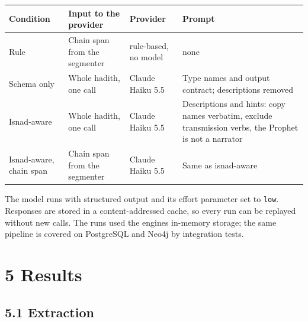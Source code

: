 \documentclass[
  english,
]{article}
\newcounter{none} %
\begin{document}
{\def\LTcaptype{none} %
\begin{longtable}[]{@{}
  >{\raggedright\arraybackslash}p{}
  >{\raggedright\arraybackslash}p{}
  >{\raggedright\arraybackslash}p{}
  >{\raggedright\arraybackslash}p{}@{}}
\toprule\noalign{}
\begin{minipage}[b]{\linewidth}\raggedright
Condition
\end{minipage} & \begin{minipage}[b]{\linewidth}\raggedright
Input to the provider
\end{minipage} & \begin{minipage}[b]{\linewidth}\raggedright
Provider
\end{minipage} & \begin{minipage}[b]{\linewidth}\raggedright
Prompt
\end{minipage} \\
\midrule\noalign{}
\endhead
\bottomrule\noalign{}
\endlastfoot
Rule & Chain span from the segmenter & rule-based, no model & none \\
Schema only & Whole hadith, one call & Claude Haiku 5.5 & Type names and
output contract; descriptions removed \\
Isnad-aware & Whole hadith, one call & Claude Haiku 5.5 & Descriptions
and hints: copy names verbatim, exclude transmission verbs, the Prophet
is not a narrator \\
Isnad-aware, chain span & Chain span from the segmenter & Claude Haiku
5.5 & Same as isnad-aware \\
\end{longtable}
}

The model runs with structured output and its effort parameter set to
\texttt{low}. Responses are stored in a content-addressed cache, so
every run can be replayed without new calls. The runs used the
engine\textquotesingle s in-memory storage; the same pipeline is covered
on PostgreSQL and Neo4j by integration tests.

\section{5 Results}\label{results}

\subsection{5.1 Extraction}\label{extraction}
\end{document}
